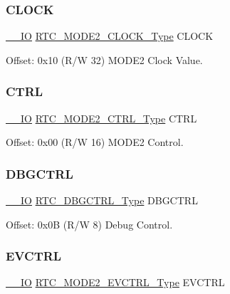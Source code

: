 \subsubsection{\texorpdfstring{CLOCK}{CLOCK}}
{\footnotesize\ttfamily \mbox{\hyperlink{core__cm0plus_8h_aec43007d9998a0a0e01faede4133d6be}{\+\_\+\+\_\+\+IO}} \mbox{\hyperlink{union_r_t_c___m_o_d_e2___c_l_o_c_k___type}{R\+T\+C\+\_\+\+M\+O\+D\+E2\+\_\+\+C\+L\+O\+C\+K\+\_\+\+Type}} C\+L\+O\+CK}



Offset\+: 0x10 (R/W 32) M\+O\+D\+E2 Clock Value. 

\mbox{\label{struct_rtc_mode2_a0830f08acb06fd9e539fd6b7ebd46882}} 
\subsubsection{\texorpdfstring{CTRL}{CTRL}}
{\footnotesize\ttfamily \mbox{\hyperlink{core__cm0plus_8h_aec43007d9998a0a0e01faede4133d6be}{\+\_\+\+\_\+\+IO}} \mbox{\hyperlink{union_r_t_c___m_o_d_e2___c_t_r_l___type}{R\+T\+C\+\_\+\+M\+O\+D\+E2\+\_\+\+C\+T\+R\+L\+\_\+\+Type}} C\+T\+RL}



Offset\+: 0x00 (R/W 16) M\+O\+D\+E2 Control. 

\mbox{\label{struct_rtc_mode2_a291f72f633a731e348a16601bc63a11a}} 
\subsubsection{\texorpdfstring{DBGCTRL}{DBGCTRL}}
{\footnotesize\ttfamily \mbox{\hyperlink{core__cm0plus_8h_aec43007d9998a0a0e01faede4133d6be}{\+\_\+\+\_\+\+IO}} \mbox{\hyperlink{union_r_t_c___d_b_g_c_t_r_l___type}{R\+T\+C\+\_\+\+D\+B\+G\+C\+T\+R\+L\+\_\+\+Type}} D\+B\+G\+C\+T\+RL}



Offset\+: 0x0B (R/W 8) Debug Control. 

\mbox{\label{struct_rtc_mode2_ae0b80d4b65e5f2a92963db08f9657cd6}} 
\subsubsection{\texorpdfstring{EVCTRL}{EVCTRL}}
{\footnotesize\ttfamily \mbox{\hyperlink{core__cm0plus_8h_aec43007d9998a0a0e01faede4133d6be}{\+\_\+\+\_\+\+IO}} \mbox{\hyperlink{union_r_t_c___m_o_d_e2___e_v_c_t_r_l___type}{R\+T\+C\+\_\+\+M\+O\+D\+E2\+\_\+\+E\+V\+C\+T\+R\+L\+\_\+\+Type}} E\+V\+C\+T\+RL}



